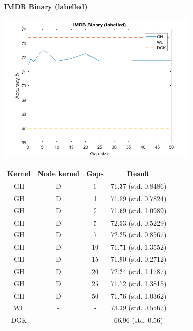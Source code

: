 \documentclass{article}
\begin{document}
\textbf{IMDB Binary (labelled)}\\
\begin{minipage}{0.6\linewidth}
	\hspace*{-1in}
	\includegraphics[width=10cm]{imdb_labelled}
	\label{fig:imdb_labelled}
\end{minipage}
\begin{minipage}[c]{0.5\linewidth}	
	\centering
	\begin{tabular}{c|c|c|c}
		Kernel & Node kernel & Gaps & Result\\
		\hline
		GH & D & 0 & 71.37 (std. 0.8486)\\
		GH & D & 1 & 71.89 (std. 0.7824)\\
		GH & D & 2 & 71.69 (std. 1.0989)\\
		GH & D & 5 & 72.53 (std. 0.5229)\\
		GH & D & 7 & 72.25 (std. 0.8567)\\
		GH & D & 10 & 71.71 (std. 1.3552)\\
		GH & D & 15 & 71.90 (std. 0.2712)\\
		GH & D & 20 & 72.24 (std. 1.1787)\\
		GH & D & 25 & 71.72 (std. 1.3815)\\
		GH & D & 50 & 71.76 (std. 1.0362)\\
		WL & - & - & 73.39 (std. 0.5567) \\
		DGK & - & - & 66.96 (std. 0.56)\\
	\end{tabular}
	\label{table:imdb_labelled}
\end{minipage}
\end{document}
